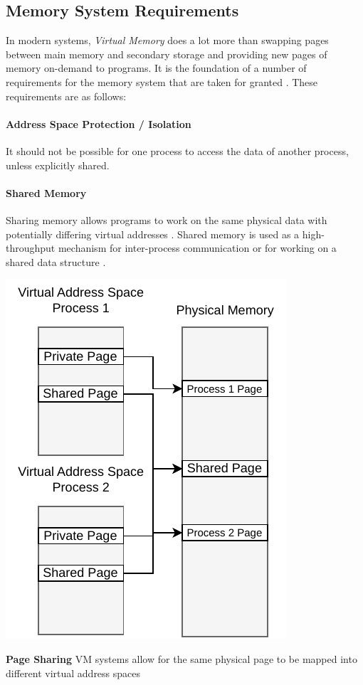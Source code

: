 \subsection{Memory System Requirements}
In modern systems, \textit{Virtual Memory} does a lot more than swapping pages between main memory and secondary
storage and providing new pages of memory on-demand to programs.
It is the foundation of a number of requirements for the memory system that are taken for granted
\cite{jacobSoftwaremanagedAddressTranslation1997}.
These requirements are as follows:


\paragraph{Address Space Protection / Isolation} It should not be possible for one process to access the data
of another process, unless explicitly shared.
\cite{jacobVirtualMemoryContemporary1998}


\paragraph{Shared Memory} Sharing memory allows programs to work on the same physical data with potentially
differing virtual addresses \cite{jacobVirtualMemoryContemporary1998}.
Shared memory is used as a high-throughput mechanism for inter-process communication or for working on
a shared data structure \cite{tanenbaumOS}.

\begin{marginfigure}
    \includegraphics*[width=1\marginparwidth]{figures/fund_share.pdf}
    \caption{\textbf{Page Sharing} VM systems allow for the same physical page to be mapped into different virtual address spaces}
\end{marginfigure}

